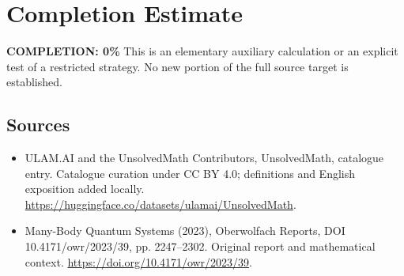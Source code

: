 \documentclass[11pt]{article}
\begin{document}
\section{Completion Estimate}
\noindent\textbf{COMPLETION: 0\%}
This is an elementary auxiliary calculation or an explicit test of a restricted strategy. No new portion of the full source target is established.

\subsection{Sources}
\begin{itemize}
\item[\hypertarget{source:statement:1}{S1}] ULAM.AI and the UnsolvedMath Contributors, UnsolvedMath, catalogue entry. Catalogue curation under CC BY 4.0; definitions and English exposition added locally.
\url{https://huggingface.co/datasets/ulamai/UnsolvedMath}.
\item[\hypertarget{source:statement:2}{S2}] Many-Body Quantum Systems (2023), Oberwolfach Reports, DOI 10.4171/owr/2023/39, pp. 2247--2302. Original report and mathematical context.
\url{https://doi.org/10.4171/owr/2023/39}.
\end{itemize}
\label{end:statement}
\end{document}
